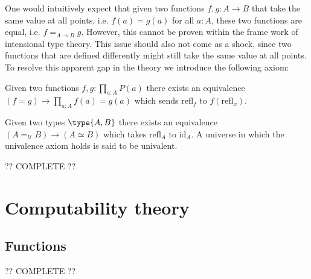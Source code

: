     One would intuitively expect that given two functions $f,g:A\rightarrow B$ that take the same value at all points, i.e. $f(a)=g(a)$ for all $a:A$, these two functions are equal, i.e. $f=_{A\rightarrow B}g$. However, this cannot be proven within the frame work of intensional type theory. This issue should also not come as a shock, since two functions that are defined differently might still take the same value at all points. To resolve this apparent gap in the theory we introduce the following axiom:
    \begin{axiom}
        Given two functions $f,g:\prod_{a:A}P(a)$ there exists an equivalence $(f=g)\rightarrow\prod_{a:A}f(a)=g(a)$ which sends $\text{refl}_f$ to $f(\text{refl}_x)$.
    \end{axiom}
    \begin{axiom}
        Given two types $\type{A,B}$ there exists an equivalence $(A=_{\mathcal{U}}B)\rightarrow(A\simeq B)$ which takes $\text{refl}_A$ to $\text{id}_A$. A universe in which the univalence axiom holds is said to be univalent.
    \end{axiom}

    ?? COMPLETE ??

\section{Computability theory}\label{section:turing}
\subsection{Functions}



    ?? COMPLETE ??